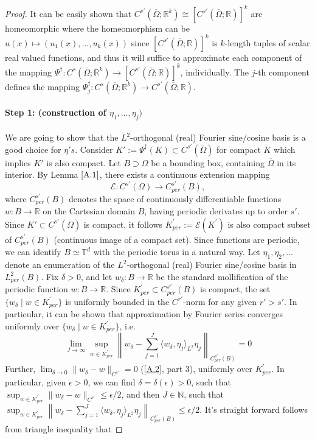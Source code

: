 \documentclass[reqno,9pt]{amsart}
\theoremstyle{plain}
\theoremstyle{definition}
\newcommand{\bb}[1]{\mathbb{#1}}
\newcommand{\cal}[1]{\mathcal{#1}}
\begin{document}
\begin{proof}
    It can be easily shown that $C^{s'}(\overline{\Omega};\bb R^k) \cong [C^{s'}(\overline{\Omega};\bb R)]^k$ are homeomorphic where the homeomorphism can be $u(x) \mapsto (u_1(x), \dots, u_k(x))$ since $[C^{s'}(\overline{\Omega};\bb R)]^k$ is $k$-length tuples of scalar real valued functions, and thus it will suffice to approximate each component of the mapping $\Psi^\dag : C^s(\overline{\Omega};\bb R^k) \to [C^{s'}(\overline{\Omega};\bb R)]^k$, individually. The $j$-th component defines the mapping $\Psi^\dag_j : C^s(\overline{\Omega};\bb R^k) \to C^{s'}(\overline{\Omega};\bb R)$. 

    \paragraph{\bf Step 1: (construction of $\eta_1, \dots, \eta_j)$} We are going to show that the $L^2$-orthogonal (real) Fourier sine/cosine basis is a good choice for $\eta's$. Consider $K':= \Psi^\dag(K) \subset C^{s'}(\overline{\Omega})$ for compact $K$ which implies $K'$ is also compact. Let $B \supset \Omega$ be a bounding box, containing $\overline{\Omega}$ in its interior. By Lemma $\ref{A.1}$, there exists a continuous extension mapping
    $$ \cal E : C^{s'}(\Omega) \to C^{s'}_{per}(B),$$
    where $C^{s'}_{per}(B)$ denotes the space of continuously differentiable functions $w : B \to \bb R$ on the Cartesian domain $B$, having periodic derivates up to order $s'$. Since $K' \subset C^{s'}(\overline{\Omega})$ is compact, it follows $K^{'}_{per} := \cal E (K^{'})$ is also compact subset of $C^{s'}_{per}(B)$ (continuous image of a compact set). Since functions are periodic, we can identify $B \simeq \bb T^d$ with the periodic torus in a natural way. Let $\eta_1, \eta_2, \dots$ denote an enumeration of the $L^2$-orthogonal (real) Fourier sine/cosine basis in $L^2_{per}(B)$. Fix $\delta > 0$, and let $w_\delta : B \to \bb R$ be the standard mollification of the periodic function $w : B \to \bb R$. Since $K^{'}_{per} \subset C^{s'}_{per}(B)$ is compact, the set $\{w_\delta \mid w \in K_{per}^{'} \}$ is uniformly bounded in the $C^{r'}$-norm for any given $r' > s'$. In particular, it can be shown that approximation by Fourier series converges uniformly over $\{w_\delta \mid w \in K^{'}_{per}\}$, i.e. 
    $$ \lim\limits_{J \to \infty} \sup\limits_{w \in K^{'}_{per}}\left\| w_\delta - \sum_{j=1}^J \langle w_\delta,\eta_j\rangle_{L^2}\eta_j\right\|_{C^{s'}_{per}(B)} = 0$$
    Further, $\lim_{\delta \to 0} \|w_\delta - w\|_{C^{s'}} = 0$ (\ref{A.2}, part 3), uniformly over $K^{'}_{per}$. In particular, given $\epsilon > 0$, we can find $\delta = \delta(\epsilon) > 0$, such that $\sup_{w \in K^{'}_{per}}\|w_\delta - w\|_{C^{s'}} \leq \epsilon/2$, and then $J \in \bb N$, such that $\sup_{w \in K^{'}_{per}} \left\|w_\delta - \sum_{j=1}^J \langle w_\delta,\eta_j\rangle_{L^2}\eta_j\right\|_{C^{s'}_{per}(B)} \leq \epsilon/2$. It's straight forward follows from triangle inequality that

\end{proof}
\end{document}

